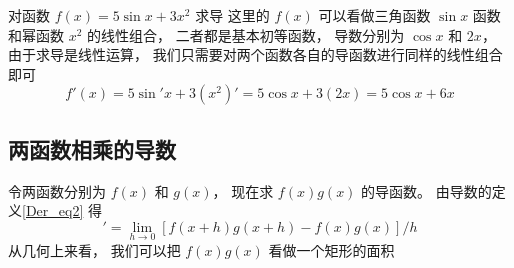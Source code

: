 \begin{exam}{对函数 $f(x) = 5\sin x + 3x^2$ 求导}
这里的 $f(x)$ 可以看做三角函数 $\sin x$ 函数和幂函数 $x^2$ 的线性组合， 二者都是基本初等函数， 导数分别为 $\cos x$ 和 $2x$， 由于求导是线性运算， 我们只需要对两个函数各自的导函数进行同样的线性组合即可
\begin{equation}
f'(x) = 5 \sin' x + 3(x^2)' = 5 \cos x + 3(2x) = 5\cos x + 6x
\end{equation}
\end{exam}

\subsection{两函数相乘的导数}
令两函数分别为 $f(x)$ 和 $g(x)$， 现在求 $f(x)g(x)$ 的导函数。 由导数的定义\autoref{Der_eq2} 得
\begin{equation}
[f(x)g(x)]' = \lim_{h\to 0}[f(x+h)g(x+h) - f(x)g(x)]/h
\end{equation}
从几何上来看， 我们可以把 $f(x)g(x)$ 看做一个矩形的面积


















